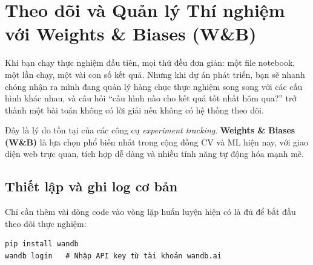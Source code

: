 \section{Theo dõi và Quản lý Thí nghiệm với Weights \& Biases (W\&B)}
\label{sec:wandb}

Khi bạn chạy thực nghiệm đầu tiên, mọi thứ đều đơn giản: một file notebook, một lần chạy, một vài con số kết quả. Nhưng khi dự án phát triển, bạn sẽ nhanh chóng nhận ra mình đang quản lý hàng chục thực nghiệm song song với các cấu hình khác nhau, và câu hỏi ``cấu hình nào cho kết quả tốt nhất hôm qua?'' trở thành một bài toán không có lời giải nếu không có hệ thống theo dõi.

Đây là lý do tồn tại của các công cụ \textit{experiment tracking}. \textbf{Weights \& Biases (W\&B)} là lựa chọn phổ biến nhất trong cộng đồng CV và ML hiện nay, với giao diện web trực quan, tích hợp dễ dàng và nhiều tính năng tự động hóa mạnh mẽ.

\subsection*{Thiết lập và ghi log cơ bản}

Chỉ cần thêm vài dòng code vào vòng lặp huấn luyện hiện có là đủ để bắt đầu theo dõi thực nghiệm:

\begin{verbatim}
pip install wandb
wandb login   # Nhập API key từ tài khoản wandb.ai
\end{verbatim}

